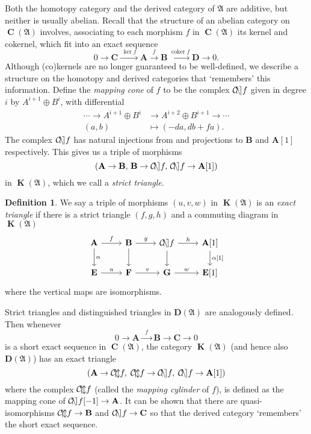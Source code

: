 \documentclass[a4paper]{article}
\theoremstyle{definition}
\newtheorem{defn}{Definition}[section]
\theoremstyle{remark}
\DeclareMathOperator{\coker}{\text{coker}}
\DeclareMathOperator{\cone}{\mathcal{C\kern -2pt o \kern -2pt n \kern -2pt e
\kern -2pt}}
\DeclareMathOperator{\cyl}{\mathcal{C\kern -2pt y \kern -2pt l\kern -2pt}}
\DeclareMathOperator{\Ch}{\mathbf{C}}
\DeclareMathOperator{\kom}{{\mathbf{K}}}
\newcommand{\deri}{\mathbf{D}}
\begin{document}
Both the homotopy category and the derived category of \(\mathfrak{A}\) are
additive, but neither is usually abelian. Recall that the structure of an
abelian category on \(\Ch(\mathfrak{A})\) involves, associating to each morphism
\(f\) in \(\Ch(\mathfrak{A})\) its kernel and cokernel, which fit into an exact
sequence 
\[0\rightarrow \mathbf{C}\xrightarrow{\;\ker f\;} \mathbf{A}
\xrightarrow{\;f\;}\mathbf{B}\xrightarrow{\coker f} \mathbf{D} \rightarrow 0 .\] 
Although (co)kernels are no longer guaranteed to be well-defined, we describe a
structure on the homotopy and derived categories that `remembers' this
information. Define the \textit{mapping cone} of \(f\) to be the complex \(\cone
f\) given in degree \(i\) by \(A^{i+1}\oplus B^i\), with differential 
\begin{align*}
    \cdots \rightarrow A^{i+1}\oplus B^i &\longrightarrow A^{i+2}\oplus B^{i+1}
    \rightarrow \cdots \\ 
    (a,b) &\longmapsto (-da, db + fa).
\end{align*}
The complex \(\cone f\) has natural injections from and projections to
\(\mathbf{B}\) and \(\mathbf{A}[1]\) respectively. This gives us a triple of morphisms 
\[(\mathbf{A}\rightarrow \mathbf{B},\, \mathbf{B}\rightarrow \cone f,\, \cone f
\rightarrow \mathbf{A}[1])\]
in \(\kom(\mathfrak{A})\), which we call a \textit{strict triangle}. 

\begin{defn}
    We say a triple of morphisms \((u,v,w)\) in \(\kom (\mathfrak{A})\) is an
    \textit{exact triangle} if there is a strict triangle \((f,g,h)\) and a
    commuting diagram in \(\kom(\mathfrak{A})\) 
    \[\begin{tikzcd}
        \mathbf{A} \arrow[r, "f"] \arrow[d, "\alpha"] 
        &\mathbf{B} \arrow[r, "g"] \arrow[d ] 
        &\cone f \arrow[r, "h"] \arrow[d ] 
        &\mathbf{A}[1] \arrow[d, "\alpha{[1]}"] \\
        \mathbf{E} \arrow[r, "u"]  
        &\mathbf{F} \arrow[r, "v"] 
        &\mathbf{G} \arrow[r, "w"]
        &\mathbf{E}[1] 
    \end{tikzcd}\]
    where the vertical maps are isomorphisms.
\end{defn}

Strict triangles and distinguished triangles in \(\deri(\mathfrak{A})\) are
analogously defined. Then whenever \[0\rightarrow\mathbf{A}\xrightarrow{\;\;f\;\;}
\mathbf{B} \longrightarrow\mathbf{C} \rightarrow 0\] is a short exact sequence
in \(\Ch(\mathfrak{A})\), the category \(\kom(\mathfrak{A})\) (and hence also
\(\deri(\mathfrak{A})\)) has an exact triangle 
\[(\mathbf{A}\rightarrow \cyl f, \; \cyl f \rightarrow \cone f, \; \cone f
\rightarrow \mathbf{A}[1])\]
where the complex \(\cyl f\) (called the \textit{mapping cylinder} of \(f\)), is
defined as the mapping cone of \(\cone f [-1]\rightarrow \mathbf{A}\). It can be
shown that there are quasi-isomorphisms \(\cyl f \rightarrow \mathbf{B}\) and
\(\cone f \rightarrow \mathbf{C}\) so that the derived category `remembers'
the short exact sequence. 
\end{document}
